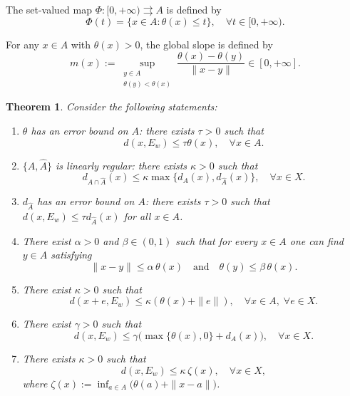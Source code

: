\documentclass[11pt]{article}
\newtheorem{theorem}{Theorem}[section]
\begin{document}
 



The set-valued map $\Phi:[0,+\infty)\rightrightarrows A$ is defined by
$$\Phi(t)=\{x\in A:\theta(x)\le t\}, \quad  \forall t \in [0,+\infty).$$

For any \(x\in A\) with \(\theta(x)>0\),  the  global slope is defined by
\[
m(x):=\sup_{\substack{y\in A\\ \theta(y)<\theta(x)}}\frac{\theta(x)-\theta(y)}{\|x-y\|}\in[0,+\infty].
\]

\begin{theorem} \label{XLWCJK}  Consider the following statements:
	\begin{enumerate}
		\item[(i)] $\theta$ has an error bound on $A$: there exists $\tau>0$ such that
		\begin{equation}\label{EBAQJ} 
			d(x,E_w)\le\tau \theta(x), \quad  \forall x\in A.
		\end{equation}		 
		\item[(ii)] $\{A,\widehat{A}\}$ is linearly regular: there exists $\kappa>0$ such that
				 $$d_{A\cap\widehat{A}}(x)\le\kappa\max\{d_A(x),d_{\widehat{A}}(x)\},   \quad  \forall     x\in X. $$  
		 
		\item[(iii)] $d_{\widehat{A}}$ has an error bound on $A$: there exists $\tau>0$ such that $d(x,E_w)\le\tau d_{\widehat{A}}(x)$ for all $x\in A$.
		\item[(iv)]  There exist  \(\alpha > 0\) and \(\beta \in (0,1)\) such that for every \(x \in A\) one can find \(y \in A\) satisfying
		\begin{equation}\label{EYZXJ} 
		\|x - y\| \le \alpha\,\theta(x) \quad\text{and}\quad \theta(y) \le \beta\,\theta(x).
		\end{equation}	
		\item[(v)]  There exist \(\kappa > 0\) such that  
		\begin{equation}\label{EBkkQJ} 
		d(x+e, E_w) \le \kappa (\theta(x) + \|e\|),  \quad  \forall x \in A, \;    \forall e \in X.
			\end{equation}	
		
		\item[(vi)]  There exist $\gamma>0$ such that  
		\begin{equation}\label{EBkXJ} 
		d(x,E_w)\le \gamma\bigl(\max\{\theta(x),0\}+d_A(x)\bigr),\quad \forall x\in X .
				\end{equation}	
		
		\item[(vii)]  There exists   \(\kappa > 0\) such that  
			$$			d(x, E_w) \le \kappa \, \zeta(x), \quad \forall x \in X, 		$$
			where  $\zeta(x) := \inf_{a \in A} \bigl( \theta(a) + \|x - a\| \bigr)$.
			

\end{enumerate}
\end{theorem}
\end{document}

